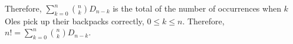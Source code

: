 \documentclass[10pt]{article}
\begin{document}
\begin{enumerate}
Therefore, $\sum \limits_{k=0}^{n} \binom{n}{k}D_{n-k}$ is the total of the number of occurrences when $k$ Oles pick up their backpacks correctly, $0 \leq k \leq n$. Therefore, $n! = \sum \limits_{k=0}^{n} \binom{n}{k}D_{n-k}$.

\end{enumerate}
\end{document}
